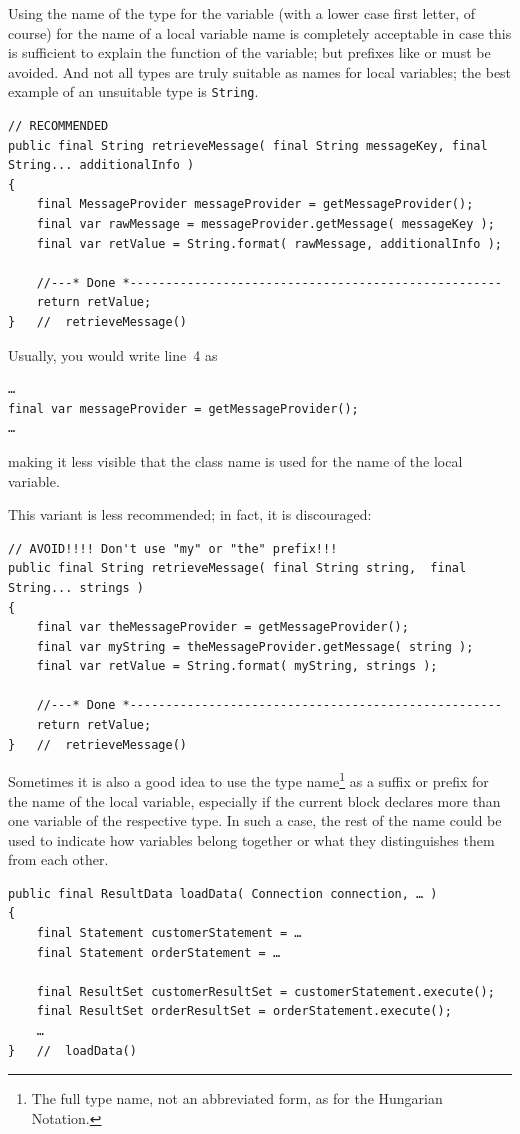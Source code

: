 Using the name of the type for the variable (with a lower case first letter, of course) for the name of a local variable name is completely acceptable in case this is sufficient to explain the function of the variable; but prefixes like  or  must be avoided. And not all types are truly suitable as names for local variables; the best example of an unsuitable type is \lstinline|String|.
\begin{lstlisting}
// RECOMMENDED
public final String retrieveMessage( final String messageKey, final String... additionalInfo )
{
    final MessageProvider messageProvider = getMessageProvider();
    final var rawMessage = messageProvider.getMessage( messageKey );
    final var retValue = String.format( rawMessage, additionalInfo );
    
    //---* Done *----------------------------------------------------
    return retValue;
}   //  retrieveMessage()
\end{lstlisting}
Usually, you would write line~4 as
\begin{lstlisting}
…
final var messageProvider = getMessageProvider();
…
\end{lstlisting}
making it less visible that the class name is used for the name of the local variable.

This variant is less recommended; in fact, it is discouraged:
\begin{lstlisting}
// AVOID!!!! Don't use "my" or "the" prefix!!!
public final String retrieveMessage( final String string,  final String... strings )
{
    final var theMessageProvider = getMessageProvider();
    final var myString = theMessageProvider.getMessage( string );
    final var retValue = String.format( myString, strings );
    
    //---* Done *----------------------------------------------------
    return retValue;
}   //  retrieveMessage()
\end{lstlisting}

Sometimes it is also a good idea to use the type name\footnote{The full type name, not an abbreviated form, as for the Hungarian Notation.} as a suffix or prefix for the name of the local variable, especially if the current block declares more than one variable of the respective type. In such a case, the rest of the name could be used to indicate how variables belong together or what they distinguishes them from each other.
\begin{lstlisting}
public final ResultData loadData( Connection connection, … )
{
    final Statement customerStatement = …
    final Statement orderStatement = …

    final ResultSet customerResultSet = customerStatement.execute();
    final ResultSet orderResultSet = orderStatement.execute();
    …
}   //  loadData()
\end{lstlisting}

